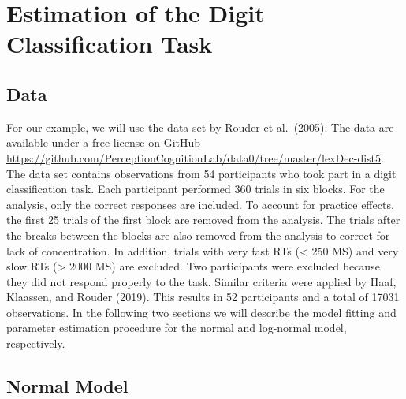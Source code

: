 \documentclass[
  english,
  doc,floatsintext]{apa6}
\begin{document}
\hypertarget{estimation-of-the-digit-classification-task}{%
\section{Estimation of the Digit Classification Task}\label{estimation-of-the-digit-classification-task}}

\hypertarget{data}{%
\subsection{Data}\label{data}}

For our example, we will use the data set by Rouder et al.~(2005). The data are available under a free license on GitHub \href{(https://github.com/PerceptionCognitionLab/data0/tree/master/lexDec-dist5)}{https://github.com/PerceptionCognitionLab/data0/tree/master/lexDec-dist5}. The data set contains observations from 54 participants who took part in a digit classification task. Each participant performed 360 trials in six blocks. For the analysis, only the correct responses are included. To account for practice effects, the first 25 trials of the first block are removed from the analysis. The trials after the breaks between the blocks are also removed from the analysis to correct for lack of concentration. In addition, trials with very fast RTs (\textless{} 250 MS) and very slow RTs (\textgreater{} 2000 MS) are excluded. Two participants were excluded because they did not respond properly to the task. Similar criteria were applied by Haaf, Klaassen, and Rouder (2019). This results in 52 participants and a total of 17031 observations. In the following two sections we will describe the model fitting and parameter estimation procedure for the normal and log-normal model, respectively.

\newpage

\hypertarget{normal-model-2}{%
\subsection{Normal Model}\label{normal-model-2}}
\end{document}
